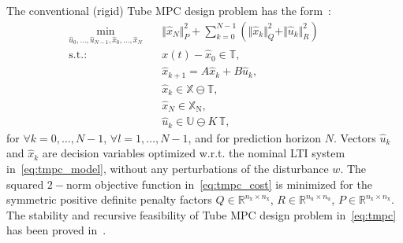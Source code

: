 \documentclass[letterpaper, 10 pt, conference]{ieeeconf}
\begin{document}


The conventional (rigid) Tube MPC design problem has the form~\cite{MS05}:
\begin{subequations}
	\label{eq:tmpc}
	\begin{eqnarray}
		\label{eq:tmpc_cost}
		\min_{\hat{u}_{0},\ldots,\hat{u}_{N-1}, \hat{x}_{0},\ldots,\hat{x}_{N} } \!\!\!\!\!\!\!\!\!\!\! &\,& \Vert \hat{x}_{N} \Vert_{P}^{2} + \sum_{k=0}^{N-1} \left( \Vert \hat{x}_{k} \Vert_{Q}^{2} + \Vert \hat{u}_{k} \Vert_{R}^{2} \right) \qquad \\
		\label{eq:tmpc_rpi}
		\mathrm{s.t.\!:} &\,& x(t) - \hat{x}_{0} \in \mathbb{T} , \\
		\label{eq:tmpc_model}
		&\,&  \hat{x}_{k+1} = A \hat{x}_{k} + B \hat{u}_{k} , \\
		\label{eq:tmpc_constraints_state}
		&\,& \hat{x}_{k} \in \mathbb{X} \ominus \mathbb{T} , \\
		\label{eq:tmpc_constraints_terminal}
		&\,& \hat{x}_{N} \in \mathbb{X}_{\mathrm{N}}, \\
		\label{eq:tmpc_constraints_input}
		&\,& \hat{u}_{k} \in \mathbb{U} \ominus K \, \mathbb{T} , 
	\end{eqnarray}
\end{subequations}
for $\forall k = 0, \dots, N-1$,  $\forall l = 1, \dots, N-1$, and for prediction horizon $N$. Vectors $\hat{u}_{k}$ and $\hat{x}_{k}$ are decision variables optimized w.r.t. the nominal LTI system in~\eqref{eq:tmpc_model}, without any perturbations of the disturbance $w$. 
The squared $2-$norm objective function in~\eqref{eq:tmpc_cost} is minimized for the symmetric positive definite penalty factors $Q \in \mathbb{R}^{n_{\mathrm{x}} \times n_{\mathrm{x}}}$, $R \in \mathbb{R}^{n_{\mathrm{u}} \times n_{\mathrm{u}}}$, $P \in \mathbb{R}^{n_{\mathrm{x}} \times n_{\mathrm{x}}}$. 
The stability and recursive feasibility of Tube MPC design problem in~\eqref{eq:tmpc} has been proved in~\cite{MS05}.
\end{document}
